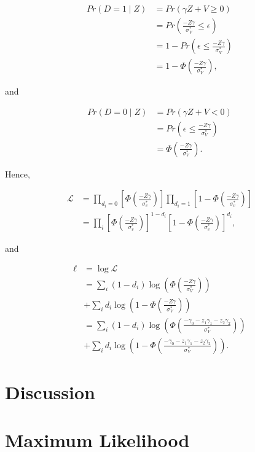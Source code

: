 \documentclass[9pt,twocolumn,twoside,]{pnas-new}
\begin{document}
\begin{align*}
Pr\left(D = 1 \mid Z\right) &= Pr\left(\gamma Z + V \geq 0 \right) \\
&= Pr\left( \frac{-Z\gamma}{\sigma^*_V} \leq \epsilon \right) \\
&= 1 - Pr\left( \epsilon \leq \frac{-Z\gamma}{\sigma^*_V} \right) \\
&= 1 - \Phi \left( \frac{-Z\gamma}{\sigma^*_V} \right),
\end{align*}

and

\begin{align*}
Pr\left(D = 0 \mid Z\right) &= Pr\left(\gamma Z + V < 0 \right) \\
&= Pr\left( \epsilon \leq \frac{-Z\gamma}{\sigma^*_V} \right) \\
&= \Phi \left( \frac{-Z\gamma}{\sigma^*_V} \right).
\end{align*}

Hence,

\begin{align*}
\mathcal{L} &= \prod_{d_i = 0} \left[ \Phi \left( \frac{-Z\gamma}{\sigma^*_v} \right) \right] \prod_{d_i = 1} \left[ 1-  \Phi \left( \frac{-Z\gamma}{\sigma^*_v} \right) \right] \\
&= \prod_{i} \left[ \Phi \left( \frac{-Z\gamma}{\sigma^*_v} \right) \right]^{1 - d_i} \left[ 1-  \Phi \left( \frac{-Z\gamma}{\sigma^*_v} \right) \right]^{d_i},
\end{align*}

and

\begin{align*}
\ell &= \log\mathcal{L} \\
&= \sum_{i} (1 - d_i) \log \left( \Phi \left( \frac{-Z\gamma}{\sigma^*_V} \right) \right) \\
&+ \sum_{i} d_i \log \left( 1 - \Phi \left( \frac{-Z\gamma}{\sigma^*_V} \right) \right) \\
&= \sum_{i} (1 - d_i) \log \left( \Phi \left( \frac{-\gamma_0 - z_1\gamma_1 - z_2\gamma_2}{\sigma^*_V} \right) \right) \\
&+ \sum_{i} d_i \log \left( 1 - \Phi \left( \frac{-\gamma_0 - z_1\gamma_1 - z_2\gamma_2}{\sigma^*_V} \right) \right).
\end{align*}

\hypertarget{discussion}{%
\section{Discussion}\label{discussion}}

\hypertarget{maximum-likelihood}{%
\section{Maximum Likelihood}\label{maximum-likelihood}}

\showmatmethods
\showacknow
\pnasbreak



% 
\end{document}
